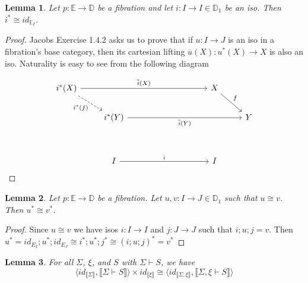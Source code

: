 \documentclass{article}
\newtheorem{lemma}{Lemma}
\newcommand{\sem}[1]{\llbracket #1 \rrbracket}
\begin{document}
\begin{lemma}
Let $p : \mathbb E \to \mathbb D$ be a fibration and let $i : I \to I \in \mathbb D_1$ be an iso. Then $i^* \cong \mathit{id}_{\mathbb E_I}$. 
\end{lemma}

\begin{proof}
Jacobs Exercise 1.4.2 asks us to prove that if $u : I \to J$ is an iso in a fibration's base category, then its cartesian lifting $\overline{u}(X) : u^*(X) \to X$ is also an iso. Naturality is easy to see from the following diagram

\[\begin{tikzcd}
	{i^*(X)} &&&&& X \\
	& {i^*(Y)} &&&&& Y \\
	\\
	& I &&&& I
	\arrow["i", from=4-2, to=4-6]
	\arrow["{i^*(f)}"', dashed, from=1-1, to=2-2]
	\arrow["{\overline{i}(Y)}"', from=2-2, to=2-7]
	\arrow["{\overline{i}(X)}", from=1-1, to=1-6]
	\arrow["f", from=1-6, to=2-7]
\end{tikzcd}\]

\end{proof}

\begin{lemma}
Let $p : \mathbb E \to \mathbb D$ be a fibration. Let $u,v : I \to J \in \mathbb D_1$ such that $u \cong v$. Then $u^* \cong v^*$. 
\label{lemma:prescong} 
\end{lemma}

\begin{proof}
Since $u \cong v$ we have isos $i : I \to I$ and $j : J \to J$ such that $i;u;j = v$. Then $u^* = \mathit{id}_{E_I};u^*;\mathit{id}_{E_J} \cong i^*;u^*;j^* \cong (i;u;j)^* = v^*$
\end{proof}

\begin{lemma}
For all $\Sigma$, $\xi$, and $S$ with $\Sigma \vdash S$,  we have $$\langle \mathit{id}_{\sem \Sigma}, \sem{\Sigma \vdash S} \rangle \times \mathit{id}_{\sem{\xi}} \cong \langle \mathit{id}_{\sem{\Sigma,\xi}}, \sem{\Sigma,\xi \vdash S} \rangle$$
\label{lemma:subswap}
\end{lemma}
\end{document}
